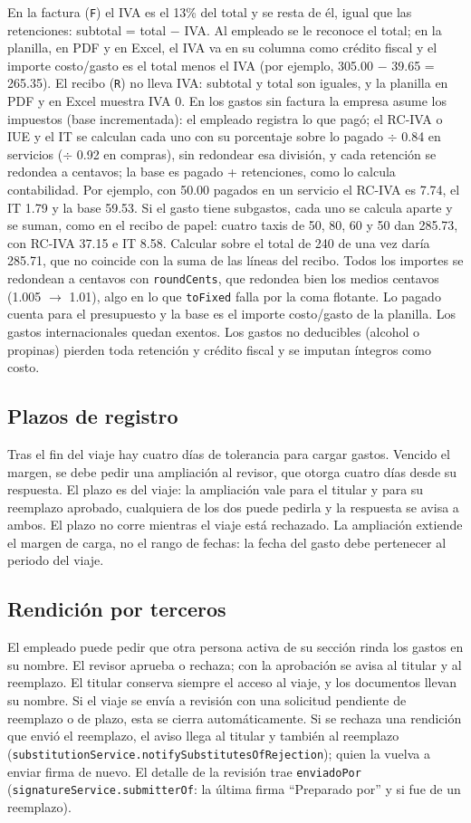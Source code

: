 \documentclass[11pt,letterpaper]{article}
\newcommand{\code}[1]{\nolinkurl{#1}}
\begin{document}
En la factura (\code{F}) el IVA es el 13\% del total y se resta de él, igual que las retenciones: subtotal = total $-$ IVA. Al empleado se le reconoce el total; en la planilla, en PDF y en Excel, el IVA va en su columna como crédito fiscal y el importe costo/gasto es el total menos el IVA (por ejemplo, 305.00 $-$ 39.65 = 265.35). El recibo (\code{R}) no lleva IVA: subtotal y total son iguales, y la planilla en PDF y en Excel muestra IVA 0. En los gastos sin factura la empresa asume los impuestos (base incrementada): el empleado registra lo que pagó; el RC-IVA o IUE y el IT se calculan cada uno con su porcentaje sobre lo pagado $\div$ 0.84 en servicios ($\div$ 0.92 en compras), sin redondear esa división, y cada retención se redondea a centavos; la base es pagado + retenciones, como lo calcula contabilidad. Por ejemplo, con 50.00 pagados en un servicio el RC-IVA es 7.74, el IT 1.79 y la base 59.53. Si el gasto tiene subgastos, cada uno se calcula aparte y se suman, como en el recibo de papel: cuatro taxis de 50, 80, 60 y 50 dan 285.73, con RC-IVA 37.15 e IT 8.58. Calcular sobre el total de 240 de una vez daría 285.71, que no coincide con la suma de las líneas del recibo. Todos los importes se redondean a centavos con \code{roundCents}, que redondea bien los medios centavos (1.005 $\rightarrow$ 1.01), algo en lo que \code{toFixed} falla por la coma flotante. Lo pagado cuenta para el presupuesto y la base es el importe costo/gasto de la planilla. Los gastos internacionales quedan exentos. Los gastos no deducibles (alcohol o propinas) pierden toda retención y crédito fiscal y se imputan íntegros como costo.

\subsection{Plazos de registro}
Tras el fin del viaje hay cuatro días de tolerancia para cargar gastos. Vencido el margen, se debe pedir una ampliación al revisor, que otorga cuatro días desde su respuesta. El plazo es del viaje: la ampliación vale para el titular y para su reemplazo aprobado, cualquiera de los dos puede pedirla y la respuesta se avisa a ambos. El plazo no corre mientras el viaje está rechazado. La ampliación extiende el margen de carga, no el rango de fechas: la fecha del gasto debe pertenecer al periodo del viaje.

\subsection{Rendición por terceros}
El empleado puede pedir que otra persona activa de su sección rinda los gastos en su nombre. El revisor aprueba o rechaza; con la aprobación se avisa al titular y al reemplazo. El titular conserva siempre el acceso al viaje, y los documentos llevan su nombre. Si el viaje se envía a revisión con una solicitud pendiente de reemplazo o de plazo, esta se cierra automáticamente. Si se rechaza una rendición que envió el reemplazo, el aviso llega al titular y también al reemplazo (\code{substitutionService.notifySubstitutesOfRejection}); quien la vuelva a enviar firma de nuevo. El detalle de la revisión trae \code{enviadoPor} (\code{signatureService.submitterOf}: la última firma ``Preparado por'' y si fue de un reemplazo).
\end{document}
